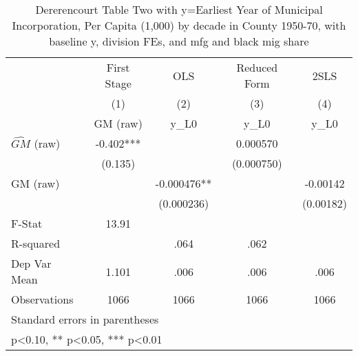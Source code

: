 \begin{table}[htbp]\centering
\def\sym#1{\ifmmode^{#1}\else\(^{#1}\)\fi}
\caption{Dererencourt Table Two with y=Earliest Year of Municipal Incorporation, Per Capita (1,000) by decade in County 1950-70, with baseline y, division FEs, and mfg and black mig share}
\begin{tabular}{l*{4}{c}}
\toprule
                    & First Stage   &         OLS   &Reduced Form   &        2SLS   \\
                    &\multicolumn{1}{c}{(1)}&\multicolumn{1}{c}{(2)}&\multicolumn{1}{c}{(3)}&\multicolumn{1}{c}{(4)}\\
                    &\multicolumn{1}{c}{GM  (raw)}&\multicolumn{1}{c}{y\_L0}&\multicolumn{1}{c}{y\_L0}&\multicolumn{1}{c}{y\_L0}\\
\midrule
$\hat{GM}$ (raw)    &      -0.402***&               &    0.000570   &               \\
                    &     (0.135)   &               &  (0.000750)   &               \\
\addlinespace
GM  (raw)           &               &   -0.000476** &               &    -0.00142   \\
                    &               &  (0.000236)   &               &   (0.00182)   \\
\midrule
F-Stat              &       13.91   &               &               &               \\
R-squared           &               &        .064   &        .062   &               \\
Dep Var Mean        &       1.101   &        .006   &        .006   &        .006   \\
Observations        &        1066   &        1066   &        1066   &        1066   \\
\bottomrule
\multicolumn{5}{l}{\footnotesize Standard errors in parentheses}\\
\multicolumn{5}{l}{\footnotesize * p<0.10, ** p<0.05, *** p<0.01}\\
\end{tabular}
\end{table}
